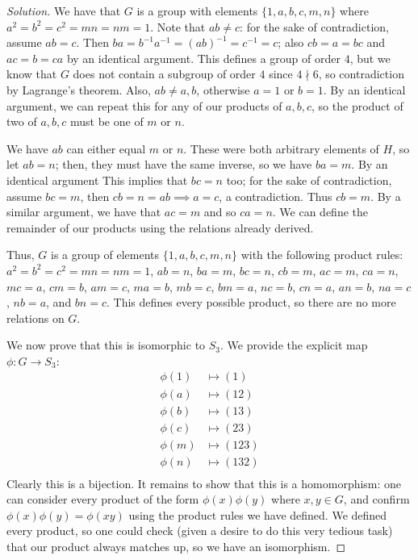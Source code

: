 \documentclass{article}
\begin{document}
\begin{proof}[Solution]
	We have that $G$ is a group with elements $\{1,a,b,c,m,n\}$
	where $a^2 = b^2 = c^2 = mn = nm = 1$.
	Note that $ab \neq c$: for the sake of contradiction, assume $ab=c$.
	Then $ba = b^{-1}a^{-1} = (ab)^{-1} = c^{-1} = c$;
	also $cb = a = bc$ and $ac = b = ca$ by an identical argument.
	This defines a group of order $4$, but we know that $G$
	does not contain a subgroup of order $4$ since $4 \nmid 6$,
	so contradiction by Lagrange's theorem.
	Also, $ab \neq a,b$, otherwise $a = 1$ or $b = 1$.
	By an identical argument, we can repeat this for any of our products of $a,b,c$,
	so the product of two of $a,b,c$ must be one of $m$ or $n$.

	We have $ab$ can either equal $m$ or $n$.
	These were both arbitrary elements of $H$, so let $ab = n$;
	then, they must have the same inverse, so we have $ba = m$.
	By an identical argument
	This implies that $bc = n$ too;
	for the sake of contradiction, assume $bc = m$, then $cb = n = ab \implies a = c$,
	a contradiction.
	Thus $cb = m$.
	By a similar argument, we have that $ac = m$ and so $ca = n$.
	We can define the remainder of our products using the relations already derived.

	Thus, $G$ is a group of elements $\{1,a,b,c,m,n\}$ with the following product rules:
	$a^2 = b^2 = c^2 = mn = nm = 1$,
	$ab = n$, $ba = m$, $bc = n$, $cb = m$, $ac = m$, $ca = n$,
	$mc = a$, $cm = b$, $am = c$, $ma = b$, $mb = c$, $bm = a$,
	$nc = b$, $cn = a$, $an = b$, $na = c$, $nb = a$, and $bn = c$.
	This defines every possible product, so there are no more relations on $G$.

	We now prove that this is isomorphic to $S_3$.
	We provide the explicit map $\phi \colon G \to S_3$:
	\begin{align*}
		\phi(1) &\mapsto (1)\\
		\phi(a) &\mapsto (12)\\
		\phi(b) &\mapsto (13)\\
		\phi(c) &\mapsto (23)\\
		\phi(m) &\mapsto (123)\\
		\phi(n) &\mapsto (132)\\
	\end{align*}
	Clearly this is a bijection.
	It remains to show that this is a homomorphism:
	one can consider every product of the form $\phi(x)\phi(y)$
	where $x,y \in G$, and confirm $\phi(x)\phi(y) = \phi(xy)$
	using the product rules we have defined.
	We defined every product,
	so one could check (given a desire to do this very tedious task)
	that our product always matches up,
	so we have an isomorphism.
\end{proof}
\end{document}

